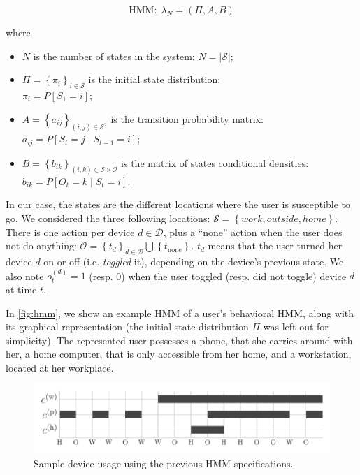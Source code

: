 $$\text{HMM}:\;\lambda_N=(\Pi, A, B)$$

where 
\begin{itemize}
	\item $N$ is the number of states in the system:
	$N = \left| \mathcal{S} \right|$;

	\item $\Pi=\left\{ \pi_i\right\}_{i\in\mathcal{S}}$ is the initial state distribution:\\
	$\pi_i=P[S_1=i]$;

	\item $A = \left\{ a_{ij}\right\}_{(i,j)\in\mathcal{S}^2}$ is the transition probability matrix:\\
	$a_{ij}=P[S_t=j \mid S_{t-1}=i]$;

	\item $B = \left\{ b_{ik}\right\}_{(i,k)\in\mathcal{S}\times\mathcal{O}}$ is the matrix of states conditional densities:
	$b_{ik} = P[O_t=k \mid S_t = i]$.
\end{itemize}

In our case, the states are the different locations where the user is susceptible to go.
We considered the three following locations: $\mathcal{S}=\left\{ \mathit{work}, \mathit{outside}, \mathit{home} \right\}$. 
There is one action per device $d\in\mathcal{D}$, plus a ``none'' action when the user does not do anything: 
$\mathcal{O} = \left\{ t_d \right\}_{d\in \mathcal{D}} \bigcup \left\{ t_\text{none} \right\}$.
$t_d$ means that the user turned her device $d$ on or off (i.e. \emph{toggled} it), depending on the device's previous state.
 We also note $o^{(d)}_t=1$ (resp. 0) when the user toggled (resp. did not toggle) device $d$ at time $t$.

In \cref{fig:hmm}, we show an example HMM of a user's behavioral HMM, along with its graphical representation (the initial state distribution $\Pi$ was left out for simplicity). 
The represented user possesses a phone, that she carries around with her, a home computer, that is only accessible from her home, and a workstation, located at her workplace.

\begin{figure}[t]
\centering
\includegraphics[width=\columnwidth]{figures/sample_usage.pdf}

\caption{\label{fig:sample_usage}Sample device usage using the previous HMM specifications. 
}

\end{figure}

